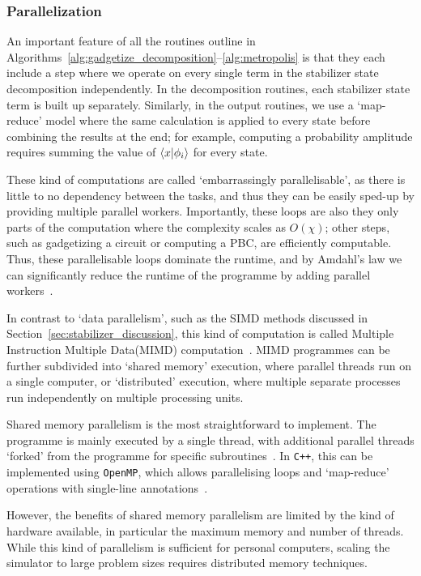 \subsubsection*{Parallelization}
An important feature of all the routines outline in Algorithms~\ref{alg:gadgetize_decomposition}--\ref{alg:metropolis} is that they each include a step where we operate on every single term in the stabilizer state decomposition independently. In the decomposition routines, each stabilizer state term is built up separately. Similarly, in the output routines, we use a `map-reduce' model where the same calculation is applied to every state before combining the results at the end; for example, computing a probability amplitude requires summing the value of $\braket{x}{\phi_{i}}$ for every state.\par
These kind of computations are called `embarrassingly parallelisable', as there is little to no dependency between the tasks, and thus they can be easily sped-up by providing multiple parallel workers. Importantly, these loops are also they only parts of the computation where the complexity scales as $O(\chi)$; other steps, such as gadgetizing a circuit or computing a PBC, are efficiently computable. Thus, these parallelisable loops dominate the runtime, and by Amdahl's law we can significantly reduce the runtime of the programme by adding parallel workers~\cite{Amdahl1967}.\par
In contrast to `data parallelism', such as the SIMD methods discussed in Section~\ref{sec:stabilizer_discussion}, this kind of computation is called Multiple Instruction Multiple Data(MIMD) computation~\cite{Flynn1972}. MIMD programmes can be further subdivided into `shared memory' execution, where parallel threads run on a single computer, or `distributed' execution, where multiple separate processes run independently on multiple processing units.\par
Shared memory parallelism is the most straightforward to implement. The programme is mainly executed by a single thread, with additional parallel threads `forked' from the programme for specific subroutines~\cite{Kessler2007}. In \texttt{C++}, this can be implemented using \texttt{OpenMP}, which allows parallelising loops and `map-reduce' operations with single-line annotations~\cite{OpenMP}.\par
However, the benefits of shared memory parallelism are limited by the kind of hardware available, in particular the maximum memory and number of threads. While this kind of parallelism is sufficient for personal computers, scaling the simulator to large problem sizes requires distributed memory techniques.\par
